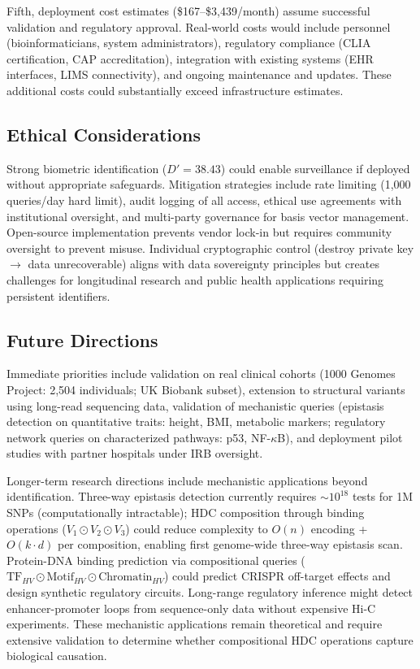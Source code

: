 \documentclass[11pt,letterpaper]{article}
\begin{document}
Fifth, deployment cost estimates (\$167--\$3,439/month) assume successful validation and regulatory approval. Real-world costs would include personnel (bioinformaticians, system administrators), regulatory compliance (CLIA certification, CAP accreditation), integration with existing systems (EHR interfaces, LIMS connectivity), and ongoing maintenance and updates. These additional costs could substantially exceed infrastructure estimates.

\subsection{Ethical Considerations}

Strong biometric identification ($D' = 38.43$) could enable surveillance if deployed without appropriate safeguards. Mitigation strategies include rate limiting (1,000 queries/day hard limit), audit logging of all access, ethical use agreements with institutional oversight, and multi-party governance for basis vector management. Open-source implementation prevents vendor lock-in but requires community oversight to prevent misuse. Individual cryptographic control (destroy private key $\rightarrow$ data unrecoverable) aligns with data sovereignty principles but creates challenges for longitudinal research and public health applications requiring persistent identifiers.

\subsection{Future Directions}

Immediate priorities include validation on real clinical cohorts (1000 Genomes Project: 2,504 individuals; UK Biobank subset), extension to structural variants using long-read sequencing data, validation of mechanistic queries (epistasis detection on quantitative traits: height, BMI, metabolic markers; regulatory network queries on characterized pathways: p53, NF-$\kappa$B), and deployment pilot studies with partner hospitals under IRB oversight.

Longer-term research directions include mechanistic applications beyond identification. Three-way epistasis detection currently requires $\sim 10^{18}$ tests for 1M SNPs (computationally intractable); HDC composition through binding operations ($V_1 \odot V_2 \odot V_3$) could reduce complexity to $O(n)$ encoding + $O(k \cdot d)$ per composition, enabling first genome-wide three-way epistasis scan. Protein-DNA binding prediction via compositional queries ($\text{TF}_{HV} \odot \text{Motif}_{HV} \odot \text{Chromatin}_{HV}$) could predict CRISPR off-target effects and design synthetic regulatory circuits. Long-range regulatory inference might detect enhancer-promoter loops from sequence-only data without expensive Hi-C experiments. These mechanistic applications remain theoretical and require extensive validation to determine whether compositional HDC operations capture biological causation.
\end{document}
